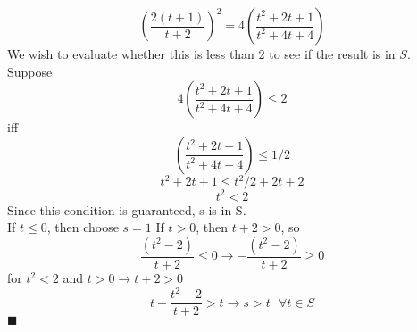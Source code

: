 \documentclass[12pt]{article}
\begin{document}
\begin{enumerate}
$$ \left(\frac{2(t+1)}{t+2}\right)^2 = 4\left(\frac{t^2 + 2t + 1}{t^2 + 4t + 4}\right)$$
We wish to evaluate whether this is less than 2 to see if the result is in $S$.
Suppose 
$$ 4\left(\frac{t^2 + 2t + 1}{t^2 + 4t + 4}\right) \leq 2$$
iff
$$ \left(\frac{t^2 + 2t + 1}{t^2 + 4t + 4}\right) \leq 1/2$$
$$ t^2 + 2t + 1 \leq t^2/2 + 2t + 2$$
$$ t^2 < 2$$
Since this condition is guaranteed, s is in S.\\
If $ t \leq 0 $, then choose $s = 1$
If $ t > 0 $, then $ t + 2 > 0$, so \\
$$ \frac{(t^2-2)}{t+2} \leq 0 \rightarrow -\frac{(t^2-2)}{t+2} \geq 0$$
for $t^2 < 2$ and $t > 0 \rightarrow t + 2 > 0$
$$ t - \frac{t^2-2}{t+2} > t \rightarrow s > t \text{ } \forall t \in S$$
$\blacksquare$\\
\end{enumerate}
\end{document}
